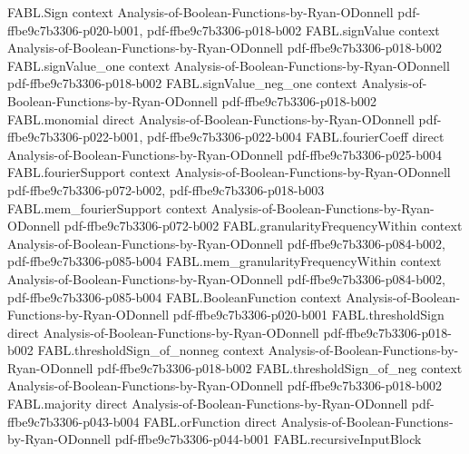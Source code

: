 \begin{theorem}
\label{FABL.orFunction_not_odd}
\leanok
{}
\proofstep
  {FABL.Sign}
  {context}
  {Analysis-of-Boolean-Functions-by-Ryan-ODonnell}
  {pdf-ffbe9c7b3306-p020-b001,
    pdf-ffbe9c7b3306-p018-b002}
\proofstep
  {FABL.signValue}
  {context}
  {Analysis-of-Boolean-Functions-by-Ryan-ODonnell}
  {pdf-ffbe9c7b3306-p018-b002}
\proofstep
  {FABL.signValue_one}
  {context}
  {Analysis-of-Boolean-Functions-by-Ryan-ODonnell}
  {pdf-ffbe9c7b3306-p018-b002}
\proofstep
  {FABL.signValue_neg_one}
  {context}
  {Analysis-of-Boolean-Functions-by-Ryan-ODonnell}
  {pdf-ffbe9c7b3306-p018-b002}
\proofstep
  {FABL.monomial}
  {direct}
  {Analysis-of-Boolean-Functions-by-Ryan-ODonnell}
  {pdf-ffbe9c7b3306-p022-b001,
    pdf-ffbe9c7b3306-p022-b004}
\proofstep
  {FABL.fourierCoeff}
  {direct}
  {Analysis-of-Boolean-Functions-by-Ryan-ODonnell}
  {pdf-ffbe9c7b3306-p025-b004}
\proofstep
  {FABL.fourierSupport}
  {context}
  {Analysis-of-Boolean-Functions-by-Ryan-ODonnell}
  {pdf-ffbe9c7b3306-p072-b002,
    pdf-ffbe9c7b3306-p018-b003}
\proofstep
  {FABL.mem_fourierSupport}
  {context}
  {Analysis-of-Boolean-Functions-by-Ryan-ODonnell}
  {pdf-ffbe9c7b3306-p072-b002}
\proofstep
  {FABL.granularityFrequencyWithin}
  {context}
  {Analysis-of-Boolean-Functions-by-Ryan-ODonnell}
  {pdf-ffbe9c7b3306-p084-b002,
    pdf-ffbe9c7b3306-p085-b004}
\proofstep
  {FABL.mem_granularityFrequencyWithin}
  {context}
  {Analysis-of-Boolean-Functions-by-Ryan-ODonnell}
  {pdf-ffbe9c7b3306-p084-b002,
    pdf-ffbe9c7b3306-p085-b004}
\proofstep
  {FABL.BooleanFunction}
  {context}
  {Analysis-of-Boolean-Functions-by-Ryan-ODonnell}
  {pdf-ffbe9c7b3306-p020-b001}
\proofstep
  {FABL.thresholdSign}
  {direct}
  {Analysis-of-Boolean-Functions-by-Ryan-ODonnell}
  {pdf-ffbe9c7b3306-p018-b002}
\proofstep
  {FABL.thresholdSign_of_nonneg}
  {context}
  {Analysis-of-Boolean-Functions-by-Ryan-ODonnell}
  {pdf-ffbe9c7b3306-p018-b002}
\proofstep
  {FABL.thresholdSign_of_neg}
  {context}
  {Analysis-of-Boolean-Functions-by-Ryan-ODonnell}
  {pdf-ffbe9c7b3306-p018-b002}
\proofstep
  {FABL.majority}
  {direct}
  {Analysis-of-Boolean-Functions-by-Ryan-ODonnell}
  {pdf-ffbe9c7b3306-p043-b004}
\proofstep
  {FABL.orFunction}
  {direct}
  {Analysis-of-Boolean-Functions-by-Ryan-ODonnell}
  {pdf-ffbe9c7b3306-p044-b001}
\proofstep
  {FABL.recursiveInputBlock}

\end{theorem}
